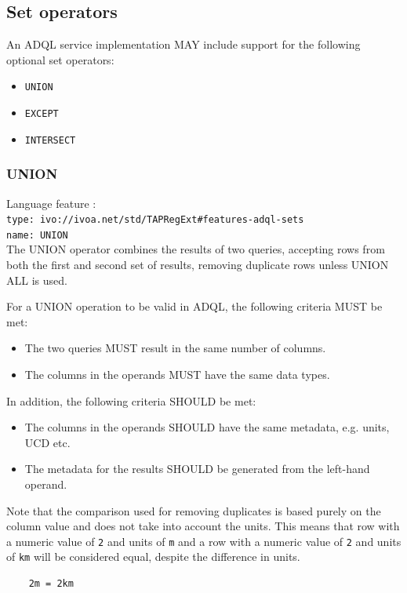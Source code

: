 \documentclass[11pt,a4paper]{ivoa}
\begin{document}
\subsection{Set operators}
\label{sec:set.operators}

An ADQL service implementation MAY include support for the following optional
set operators:

\begin{itemize}
    \item \verb:UNION:
    \item \verb:EXCEPT:
    \item \verb:INTERSECT:
\end{itemize}

\subsubsection{UNION}
{\footnotesize Language feature :}\\
{\footnotesize \verb|type: ivo://ivoa.net/std/TAPRegExt#features-adql-sets|}\\
{\footnotesize \verb|name: UNION|}\\

The UNION operator combines the results of two queries, accepting rows from
both the first and second set of results,
removing duplicate rows unless UNION ALL is used.

For a UNION operation to be valid in ADQL, the following criteria MUST be met:
\begin{itemize}
    \item The two queries MUST result in the same number of columns.
    \item The columns in the operands MUST have the same data types.
\end{itemize}

In addition, the following criteria SHOULD be met: 
\begin{itemize}
    \item The columns in the operands SHOULD have the same metadata, e.g. units, UCD etc.
    \item The metadata for the results SHOULD be generated from the left-hand operand.
\end{itemize}

Note that the comparison used for removing duplicates is based purely on the
column value and does not take into account the units.
This means that row with a numeric value of \verb:2: and units of \verb:m:
and a row with a numeric value of \verb:2: and units of \verb:km: will be
considered equal, despite the difference in units.
\begin{verbatim}
    2m = 2km
\end{verbatim}
\end{document}
